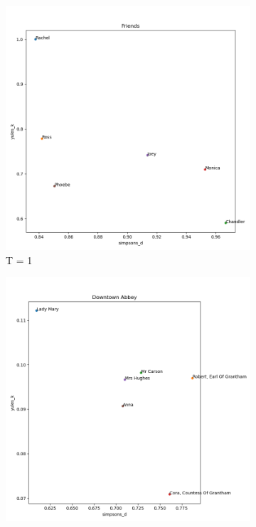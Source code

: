 \documentclass{article}
\begin{document}
\begin{titlepage}
    \begin{figure}[H]
        \centering
        \caption{Decision Stumps of AdaBoost (Misclassifications of each stump highlighted)}
        \begin{subfigure}[b]{0.45\textwidth}
            \centering
            \includegraphics[width=\textwidth]{images/Friends_heuristics.png}
            \caption{T = 1}
            \label{fig:subfig1}
        \end{subfigure}
        \hfill
        \begin{subfigure}[b]{0.45\textwidth}
            \centering
            \includegraphics[width=\textwidth]{images/Downtown Abbey_heuristics.png}

\end{subfigure}
\end{figure}
\end{titlepage}
\end{document}
